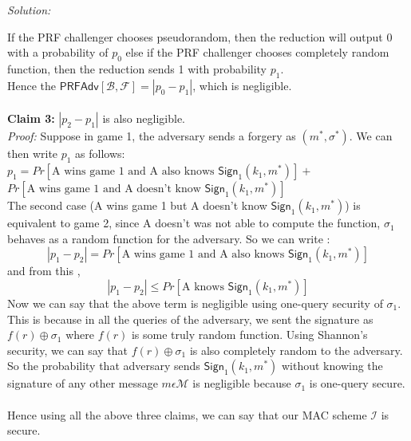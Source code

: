 \documentclass[a4paper, 11pt]{article}
\newenvironment{solution}
    {\textit{Solution:}}
    {\clearpage}
\newcommand{\sign}{\mathsf{Sign}}
\newcommand{\calB}{\mathcal{B}}
\newcommand{\calF}{\mathcal{F}}
\newcommand{\calI}{\mathcal{I}}
\newcommand{\calM}{\mathcal{M}}
\begin{document}
\begin{solution}
\begin{enumerate}[(a)]
\begin{itemize}
         \end{itemize}
         If the PRF challenger chooses pseudorandom, then the reduction will output 0 with a probability of $p_0$ else if the PRF challenger chooses completely random function, then the reduction sends 1 with probability $p_1$.\\
         Hence the $\mathsf{PRFAdv}[\calB, \calF] = |p_0 - p_1|$, which is negligible. 
         \\ \\ 
         \textbf{Claim 3:} $|p_2 - p_1|$ is also negligible. \\
         \textit{Proof:} Suppose in game 1, the adversary sends a forgery as $(m^*, \sigma^*)$. We can then write $p_1$ as follows: \\
         $p_1 = Pr[\text{A wins game 1 and A also knows $\sign_1(k_1, m^*)$}] +$ \\ 
         $Pr[\text{A wins game 1 and A doesn't know $\sign_1(k_1, m^*)$}]$
        \\
        The second case (A wins game 1 but A doesn't know $\sign_1(k_1, m^*)$) is equivalent to game 2, since A doesn't was not able to compute the function, $\sigma_1$ behaves as a random function for the adversary. So we can write : 
        $$|p_1 - p_2| = Pr[\text{A wins game 1 and A also knows $\sign_1(k_1, m^*)$}]$$ and from this , 
        $$|p_1 - p_2| \leq Pr[\text{A knows $\sign_1(k_1, m^*)$}]$$
        Now we can say that the above term is negligible using one-query security of $\sigma_1$. This is because in all the queries of the adversary, we sent the signature as $f(r) \oplus \sigma_1$ where $f(r)$ is some truly random function. Using Shannon's security, we can say that $f(r) \oplus \sigma_1$ is also completely random to the adversary. So the probability that adversary sends $\sign_1(k_1, m^*)$ without knowing the signature of any other message $m \epsilon \calM$ is negligible because $\sigma_1$ is one-query secure. \\ \\ 
        Hence using all the above three claims, we can say that our MAC scheme $\calI$ is secure.
        
    \end{enumerate}
\end{solution}
\end{document}
